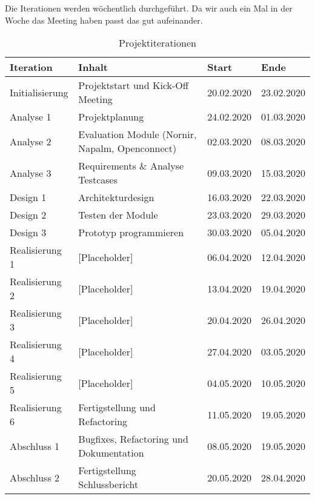 \documentclass[
	ngerman,
	toc=listof, %
	toc=bibliography, %
	footnotes=multiple, %
	parskip=half, %
	numbers=noendperiod %
]{scrartcl}
\begin{document}
		Die Iterationen werden wöchentlich durchgeführt.
		Da wir auch ein Mal in der Woche das Meeting haben passt das gut aufeinander.

		\begin{table}[!h]
			\begin{tabularx}{\textwidth}{lXll}
				\toprule
				Iteration & Inhalt & Start & Ende \\
				\midrule
				Initialisierung & Projektstart und Kick-Off Meeting & 20.02.2020 & 23.02.2020 \\
				Analyse 1 & Projektplanung & 24.02.2020 & 01.03.2020 \\
				Analyse 2 & Evaluation Module (Nornir, Napalm, Openconnect) & 02.03.2020 & 08.03.2020 \\
				Analyse 3 & Requirements \& Analyse Testcases & 09.03.2020 & 15.03.2020 \\
				Design 1 & Architekturdesign & 16.03.2020 & 22.03.2020 \\
				Design 2 & Testen der Module & 23.03.2020 & 29.03.2020 \\
				Design 3 & Prototyp programmieren & 30.03.2020 & 05.04.2020 \\
				Realisierung 1 & [Placeholder] & 06.04.2020 & 12.04.2020 \\
				Realisierung 2 & [Placeholder] & 13.04.2020 & 19.04.2020 \\
				Realisierung 3 & [Placeholder] & 20.04.2020 & 26.04.2020 \\
				Realisierung 4 & [Placeholder] & 27.04.2020 & 03.05.2020 \\
				Realisierung 5 & [Placeholder] & 04.05.2020 & 10.05.2020 \\
				Realisierung 6 & Fertigstellung und Refactoring & 11.05.2020 & 19.05.2020 \\
				Abschluss 1 & Bugfixes, Refactoring und Dokumentation & 08.05.2020 & 19.05.2020\\
				Abschluss 2 & Fertigstellung Schlussbericht & 20.05.2020 & 28.04.2020\\
				\bottomrule
			\end{tabularx}
			\caption{Projektiterationen}
		\end{table}
\end{document}
